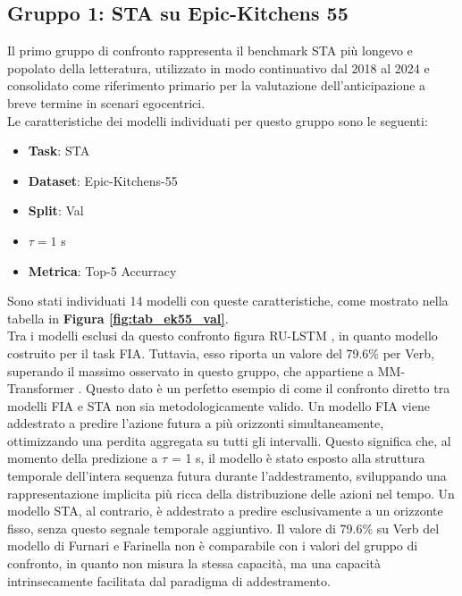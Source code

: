 \subsection{Gruppo 1: STA su Epic-Kitchens 55}
Il primo gruppo di confronto rappresenta il benchmark STA più longevo e popolato della letteratura, utilizzato in modo continuativo dal 2018 al 2024 e consolidato come riferimento primario per la valutazione dell'anticipazione a breve termine in scenari egocentrici. \\ 
Le caratteristiche dei modelli individuati per questo gruppo sono le seguenti:
\begin{itemize}
    \item \textbf{Task}: STA
    \item \textbf{Dataset}: Epic-Kitchens-55
    \item \textbf{Split}: Val
    \item $\tau = 1$ s
    \item \textbf{Metrica}: Top-5 Accurracy
\end{itemize}
Sono stati individuati 14 modelli con queste caratteristiche, come mostrato nella tabella in \textbf{Figura \ref{fig:tab_ek55_val}}. \\
Tra i modelli esclusi da questo confronto figura RU-LSTM \cite{furnari2019would, furnari2020rolling}, in quanto modello costruito per il task FIA. Tuttavia, esso riporta un valore del 79.6\% per Verb, superando il massimo osservato in questo gruppo, che appartiene a MM-Transformer \cite{roy2021action}. Questo dato è un perfetto esempio di come il confronto diretto tra modelli FIA e STA non sia metodologicamente valido. Un modello FIA viene addestrato a predire l'azione futura a più orizzonti simultaneamente, ottimizzando una perdita aggregata su tutti gli intervalli. Questo significa che, al momento della predizione a $\tau$ = 1 s, il modello è stato esposto alla struttura temporale dell'intera sequenza futura durante l'addestramento, sviluppando una rappresentazione implicita più ricca della distribuzione delle azioni nel tempo. Un modello STA, al contrario, è addestrato a predire esclusivamente a un orizzonte fisso, senza questo segnale temporale aggiuntivo. Il valore di 79.6\% su Verb del modello di Furnari e Farinella \cite{furnari2019would, furnari2020rolling} non è comparabile con i valori del gruppo di confronto, in quanto non misura la stessa capacità, ma una capacità intrinsecamente facilitata dal paradigma di addestramento. \\
